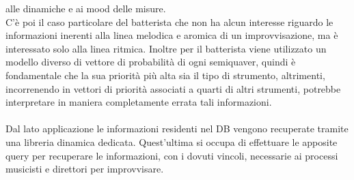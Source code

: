 alle dinamiche e ai mood delle misure.\\
C'è poi il caso particolare del batterista
che non ha alcun interesse riguardo le informazioni inerenti alla linea melodica 
e aromica di un improvvisazione, ma è interessato solo alla linea ritmica. Inoltre
per il batterista viene utilizzato un modello diverso di vettore di probabilità 
di ogni semiquaver, quindi è fondamentale che la sua priorità più alta sia il tipo 
di strumento, altrimenti, incorrenendo in vettori di priorità associati a quarti di
altri strumenti, potrebbe interpretare in maniera completamente errata tali informazioni.\\\\
Dal lato applicazione le informazioni residenti nel DB vengono recuperate tramite
una libreria dinamica dedicata. Quest'ultima si occupa di effettuare le apposite
query per recuperare le informazioni, con i dovuti vincoli, necessarie ai processi 
musicisti e direttori per improvvisare.
